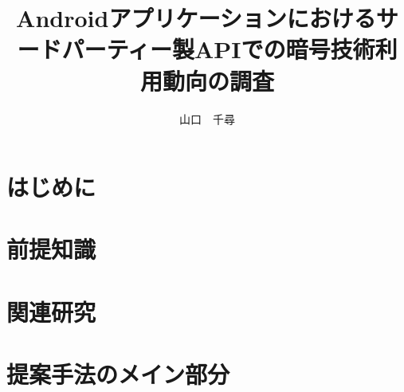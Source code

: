 \documentclass[a4j]{jarticle}
\date{}
\begin{document}
\makeatletter %
	\def\@thesis{令和2年度 東邦大学理学部情報科学科 卒業研究}
	\def\id#1{\def\@id{#1}}
	\def\department#1{\def\@department{#1}}
	
	\def\@maketitle{
		\begin{center}
			\vspace{10mm}
			{\large \@thesis \par}	%
			\vspace{50mm}
			{\huge\bf \@title \par}	%
			\vspace{15mm}
			{\Large 学籍番号　\@id \par}	%
			\vspace{5mm}
			{\Large \@author \par}	%
			\vspace{50mm}
		\end{center}
		\begin{flushright}
			{\large 金岡研究室}
		\end{flushright}
	}
\makeatother

\title{Androidアプリケーションにおけるサードパーティー製APIでの暗号技術利用動向の調査} %
\id{5517097} %
\author{山口　千尋} %
\maketitle{\title} %
\thispagestyle{empty} %
\newpage %

\tableofcontents %
\section{はじめに}
\section{前提知識}
\section{関連研究}
\section{提案手法のメイン部分}
\section{}
\section{}
\end{document}
